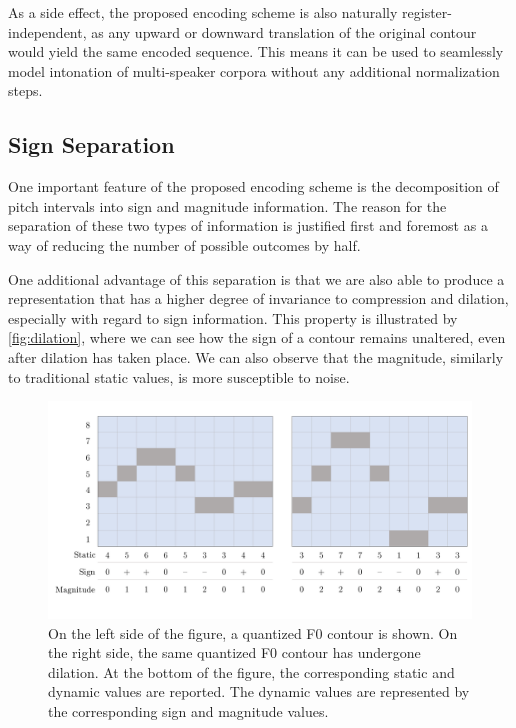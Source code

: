 As a side effect, the proposed encoding scheme is also naturally register-independent, as any upward or downward translation of the original contour would yield the same encoded sequence.
This means it can be used to seamlessly model intonation of multi-speaker corpora without any additional normalization steps.


\subsection{Sign Separation}

One important feature of the proposed encoding scheme is the decomposition of pitch intervals into sign and magnitude information.
The reason for the separation of these two types of information is justified first and foremost as a way of reducing the number of possible outcomes by half.

One additional advantage of this separation is that we are also able to produce a representation that has a higher degree of invariance to compression and dilation, especially with regard to sign information.
This property is illustrated by \autoref{fig:dilation}, where we can see how the sign of a contour remains unaltered, even after dilation has taken place.
We can also observe that the magnitude, similarly to traditional static values, is more susceptible to noise.



\begin{figure}[H]
    \centering
    \includegraphics[scale=0.35]{figures/dilation.pdf}
    \caption[Contour dilation]{On the left side of the figure, a quantized \ac{F0} contour is shown. On the right side, the same quantized \ac{F0} contour has undergone dilation. At the bottom of the figure, the corresponding static and dynamic values are reported. The dynamic values are represented by the corresponding sign and magnitude values.}
    \label{fig:dilation}
\end{figure}




